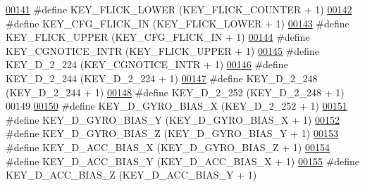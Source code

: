 \begin{DoxyCode}
\hypertarget{dmp_key_8h_source.tex_l00141}{}\hyperlink{dmp_key_8h_ad014d1d1e25860c08d35e8bdc10bba8c}{00141} \textcolor{preprocessor}{#define KEY\_FLICK\_LOWER             (KEY\_FLICK\_COUNTER + 1)}
\hypertarget{dmp_key_8h_source.tex_l00142}{}\hyperlink{dmp_key_8h_a0bf1aa125523ba79e89fd86f3827878a}{00142} \textcolor{preprocessor}{#define KEY\_CFG\_FLICK\_IN            (KEY\_FLICK\_LOWER + 1)}
\hypertarget{dmp_key_8h_source.tex_l00143}{}\hyperlink{dmp_key_8h_a0bec5499d24ecfdecb16902a481ff99f}{00143} \textcolor{preprocessor}{#define KEY\_FLICK\_UPPER             (KEY\_CFG\_FLICK\_IN + 1)}
\hypertarget{dmp_key_8h_source.tex_l00144}{}\hyperlink{dmp_key_8h_ae065cd2d13551072f4583ed8d8d1f2d2}{00144} \textcolor{preprocessor}{#define KEY\_CGNOTICE\_INTR           (KEY\_FLICK\_UPPER + 1)}
\hypertarget{dmp_key_8h_source.tex_l00145}{}\hyperlink{dmp_key_8h_a347a636f558e3dbe34416cd0bf1c2553}{00145} \textcolor{preprocessor}{#define KEY\_D\_2\_224                 (KEY\_CGNOTICE\_INTR + 1)}
\hypertarget{dmp_key_8h_source.tex_l00146}{}\hyperlink{dmp_key_8h_ae6367d55927a5d33025e26cdb2802156}{00146} \textcolor{preprocessor}{#define KEY\_D\_2\_244                 (KEY\_D\_2\_224 + 1)}
\hypertarget{dmp_key_8h_source.tex_l00147}{}\hyperlink{dmp_key_8h_a88cb8e3e64bc8a2fe2ff8eaab144ee9e}{00147} \textcolor{preprocessor}{#define KEY\_D\_2\_248                 (KEY\_D\_2\_244 + 1)}
\hypertarget{dmp_key_8h_source.tex_l00148}{}\hyperlink{dmp_key_8h_abb1983e9ff8a9ea79e3f25c25d7abd40}{00148} \textcolor{preprocessor}{#define KEY\_D\_2\_252                 (KEY\_D\_2\_248 + 1)}
00149 
\hypertarget{dmp_key_8h_source.tex_l00150}{}\hyperlink{dmp_key_8h_aef766eac70bd5f9b79063b218defdb75}{00150} \textcolor{preprocessor}{#define KEY\_D\_GYRO\_BIAS\_X               (KEY\_D\_2\_252 + 1)}
\hypertarget{dmp_key_8h_source.tex_l00151}{}\hyperlink{dmp_key_8h_a6b4c25f825b632321adbb3f6a2e4a24e}{00151} \textcolor{preprocessor}{#define KEY\_D\_GYRO\_BIAS\_Y               (KEY\_D\_GYRO\_BIAS\_X + 1)}
\hypertarget{dmp_key_8h_source.tex_l00152}{}\hyperlink{dmp_key_8h_aacbde5b7bf772a13472196e8a39cd4a3}{00152} \textcolor{preprocessor}{#define KEY\_D\_GYRO\_BIAS\_Z               (KEY\_D\_GYRO\_BIAS\_Y + 1)}
\hypertarget{dmp_key_8h_source.tex_l00153}{}\hyperlink{dmp_key_8h_ae9e554e3ebbcf665607d9be691bd67c3}{00153} \textcolor{preprocessor}{#define KEY\_D\_ACC\_BIAS\_X                (KEY\_D\_GYRO\_BIAS\_Z + 1)}
\hypertarget{dmp_key_8h_source.tex_l00154}{}\hyperlink{dmp_key_8h_a5428e476798576d70c877d9e681da541}{00154} \textcolor{preprocessor}{#define KEY\_D\_ACC\_BIAS\_Y                (KEY\_D\_ACC\_BIAS\_X + 1)}
\hypertarget{dmp_key_8h_source.tex_l00155}{}\hyperlink{dmp_key_8h_aee86cca74b68b4f54f8e939a4419f7b4}{00155} \textcolor{preprocessor}{#define KEY\_D\_ACC\_BIAS\_Z                (KEY\_D\_ACC\_BIAS\_Y + 1)}

\end{DoxyCode}
